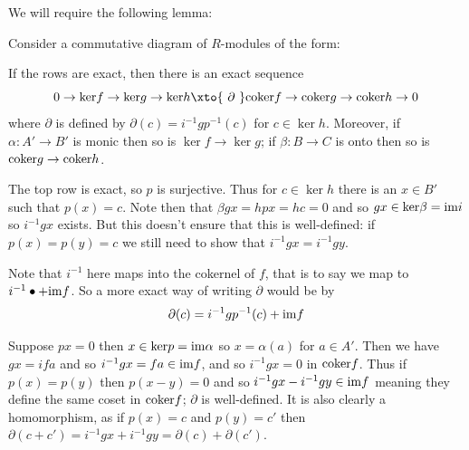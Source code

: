 \eexam

We will require the following lemma:

\blemm[title=Snake lemma]

    Consider a commutative diagram of $R$-modules of the form:

    \centerline{}

    If the rows are exact, then there is an exact sequence
    $$ 0\to\ker f\to\ker g\to\ker h\xto{\ \partial\ }\coker f\to\coker g\to\coker h\to0 $$
    where $\partial$ is defined by $\partial(c)=i^{-1}gp^{-1}(c)$ for $c\in\ker h$.
    Moreover, if $\alpha\colon A'\to B'$ is monic then so is $\ker f\to\ker g$; if $\beta\colon B\to C$ is onto then so is ${\rm coker} g\to{\rm coker} h$.

\elemm

\bproof

    The top row is exact, so $p$ is surjective.
    Thus for $c\in\ker h$ there is an $x\in B'$ such that $p(x)=c$.
    Note then that $\beta gx=hpx=hc=0$ and so $gx\in{\rm ker}\beta={\rm im} i$ so $i^{-1}gx$ exists.
    But this doesn't ensure that this is well-defined: if $p(x)=p(y)=c$ we still need to show that $i^{-1}gx=i^{-1}gy$.

    Note that $i^{-1}$ here maps into the cokernel of $f$, that is to say we map to $i^{-1}\bullet+{\rm im} f$.
    So a more exact way of writing $\partial$ would be by
    $$ \partial(c) = i^{-1}gp^{-1}(c) + {\rm im} f $$

    Suppose $px=0$ then $x\in{\rm ker} p={\rm im}\alpha$ so $x=\alpha(a)$ for $a\in A'$.
    Then we have $gx=ifa$ and so $i^{-1}gx=fa\in{\rm im} f$, and so $i^{-1}gx=0$ in ${\rm coker} f$.
    Thus if $p(x)=p(y)$ then $p(x-y)=0$ and so $i^{-1}gx-i^{-1}gy\in{\rm im} f$ meaning they define the same coset in ${\rm coker} f$; $\partial$ is well-defined.
    It is also clearly a homomorphism, as if $p(x)=c$ and $p(y)=c'$ then $\partial(c+c')=i^{-1}gx+i^{-1}gy=\partial(c)+\partial(c')$.

